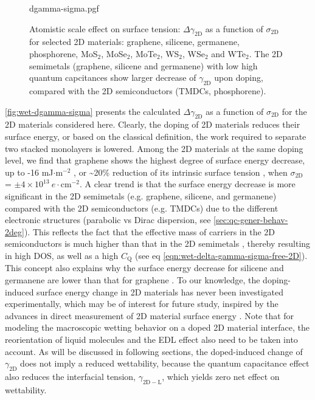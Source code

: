 \begin{figure}[!htbp]
  \centering
  {dgamma-sigma.pgf}
\caption{\label{fig:wet-dgamma-sigma} Atomistic scale effect on surface tension:
  \(\Delta \gamma_{\mathrm{2D}}\) as a function of
  \(\sigma_{\mathrm{2D}}\) for selected 2D materials: graphene,
  silicene, germanene, phosphorene, MoS\(_{2}\), MoSe\(_{2}\),
  MoTe\(_{2}\), WS\(_{2}\), WSe\(_{2}\) and WTe\(_{2}\). The 2D
  semimetals (graphene, silicene and germanene) with low high quantum
  capcitances show larger decrease of \(\gamma_{\mathrm{2D}}\) upon
  doping, compared with the 2D semiconductors (TMDCs, phosphorene).}
\end{figure}

\autoref{fig:wet-dgamma-sigma} presents the calculated
\(\Delta \gamma_{\mathrm{2D}}\) as a function of
\(\sigma_{\mathrm{2D}}\) for the 2D materials considered
here.
%
Clearly, the doping of 2D materials reduces their surface
energy, or based on the classical definition, the work required to
separate two stacked monolayers is lowered.
%
Among the 2D materials at
the same doping level, we find that graphene shows the highest degree
of surface energy decrease, up to -16 mJ\(\cdot \mathrm{m}^{-2}\) , or
\textasciitilde{}20\% reduction of its intrinsic surface tension
\cite{shih_2013_wetting_natmat}, when \(\sigma_{\mathrm{2D}}\) =
\(\pm 4\times10^{13}\ e\cdot \mathrm{cm}^{-2}\).
%
A clear trend is that the surface energy decrease is more significant
in the 2D semimetals (e.g. graphene, silicene, and germanene) compared
with the 2D semiconductors (e.g. TMDCs) due to the different
electronic structures (parabolic vs Dirac dispersion, see
\autoref{sec:qc-gener-behav-2deg}).
%
This reflects the fact that the effective mass of carriers in the 2D
semiconductors is much higher than that in the 2D semimetals
\cite{Davies_1997_book}, thereby resulting in high DOS, as well as a
high \(C_{\mathrm{Q}}\) (see eq
\autoref{eqn:wet-delta-gamma-sigma-free-2D}). This concept also
explains why the surface energy decrease for silicene and germanene
are lower than that for graphene \cite{Yan_2013_e-hv-couple}.  To our
knowledge, the doping-induced surface energy change in 2D materials
has never been investigated experimentally, which may be of interest
for future study, inspired by the advances in direct measurement of 2D
material surface energy \cite{van_Engers_2017_direct_surf_gr}. Note
that for modeling the macroscopic wetting behavior on a doped 2D
material interface, the reorientation of liquid molecules and the EDL
effect also need to be taken into account.
%
As will be discussed
in following sections, the doped-induced change of \(\gamma_{\mathrm{2D}}\) does not
imply a reduced wettability, because the quantum capacitance effect
also reduces the interfacial tension, \(\gamma_{\mathrm{2D-L}}\),
which yields zero net effect on wettability.

